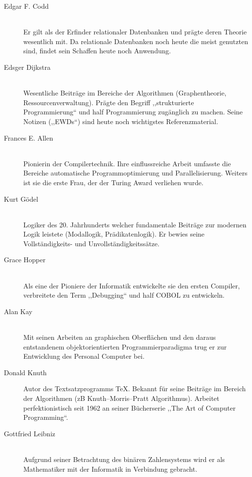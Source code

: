 \begin{description}
  \item[Edgar F. Codd ] \hfill{} \\
    Er gilt als der Erfinder relationaler Datenbanken und prägte deren Theorie wesentlich mit. Da relationale Datenbanken noch heute die meist genutzten sind, findet sein Schaffen heute noch Anwendung.

  \item[Edsger Dijkstra ] \hfill{} \\
    Wesentliche Beiträge im Bereiche der Algorithmen (Graphentheorie, Ressourcenverwaltung).
    Prägte den Begriff ,,strukturierte Programmierung`` und half Programmierung zugänglich zu machen.
    Seine Notizen (,,EWDs``) sind heute noch wichtigstes Referenzmaterial.
  
  \item[Frances E. Allen ] \hfill{} \\
      Pionierin der Compilertechnik. Ihre einflussreiche Arbeit umfasste die Bereiche automatische Programmoptimierung und Parallelisierung. 
      Weiters ist sie die erste Frau, der der Turing Award verliehen wurde.

  \item[Kurt Gödel ] \hfill{} \\
    Logiker des 20. Jahrhunderts welcher fundamentale Beiträge zur modernen Logik leistete
    (Modallogik, Prädikatenlogik). Er bewies seine Vollständigkeits- und Unvollständigkeitssätze.

  \item[Grace Hopper ] \hfill{} \\
    Als eine der Pioniere der Informatik entwickelte sie den ersten Compiler, verbreitete den Term ,,Debugging`` und half COBOL zu entwickeln.

  \item[Alan Kay ] \hfill{} \\
    Mit seinen Arbeiten an graphischen Oberflächen und den daraus entstandenem objektorientierten Programmierparadigma trug er zur Entwicklung des Personal Computer bei.

  \item[Donald Knuth ] \hfill{}
    Autor des Textsatzprogramms \TeX. Bekannt für seine Beiträge im Bereich der Algorithmen (zB Knuth–Morris–Pratt Algorithmus). Arbeitet perfektionistisch seit 1962 an seiner Bücherserie ,,The Art of Computer Programming``.

  \item[Gottfried Leibniz ] \hfill{} \\
    Aufgrund seiner Betrachtung des binären Zahlensystems wird er als Mathematiker mit der Informatik in Verbindung gebracht.


\end{description}
